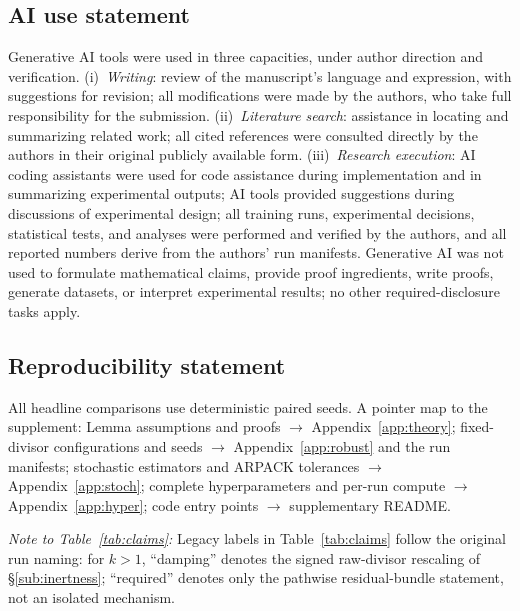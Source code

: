 \documentclass{article}
\theoremstyle{plain}
\theoremstyle{definition}
\theoremstyle{remark}
\begin{document}
\subsection*{AI use statement}
Generative AI tools were used in three capacities, under author direction
and verification. (i)~\emph{Writing}: review of the manuscript's
language and expression, with suggestions for revision; all
modifications were made by the authors, who take full responsibility
for the submission.
(ii)~\emph{Literature search}: assistance in locating and summarizing
related work; all cited references were consulted directly by the
authors in their original publicly available form. (iii)~\emph{Research
execution}: AI coding assistants were used for
code assistance during implementation and in summarizing experimental
outputs; AI tools provided suggestions during discussions of
experimental design; all training runs, experimental decisions,
statistical tests, and analyses were performed and verified by the
authors, and all reported numbers derive from the authors' run manifests.
Generative AI was not used to formulate mathematical claims, provide proof
ingredients, write proofs, generate datasets, or interpret experimental
results; no other required-disclosure tasks apply.

\subsection*{Reproducibility statement}
All headline comparisons use deterministic paired seeds. A pointer map
to the supplement: Lemma assumptions and proofs $\to$
Appendix~\ref{app:theory}; fixed-divisor configurations and seeds $\to$
Appendix~\ref{app:robust} and the run manifests; stochastic estimators
and ARPACK tolerances $\to$ Appendix~\ref{app:stoch}; complete
hyperparameters and per-run compute $\to$ Appendix~\ref{app:hyper};
code entry points $\to$ supplementary README.




\appendix

\noindent\emph{Note to Table~\ref{tab:claims}:} Legacy labels in
Table~\ref{tab:claims} follow the original run naming: for $k{>}1$,
``damping'' denotes the signed raw-divisor rescaling of
\S\ref{sub:inertness}; ``required'' denotes only the pathwise
residual-bundle statement, not an isolated mechanism.
\end{document}

